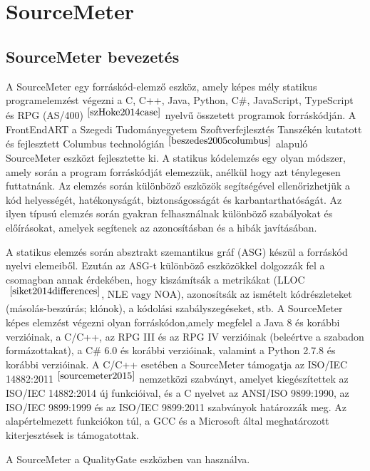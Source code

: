 \chapter{SourceMeter}\label{chap:SourceMeter}

\section{SourceMeter bevezetés}

\noindent

A SourceMeter egy forráskód-elemző eszköz, amely képes mély statikus programelemzést végezni a C, C++, Java, Python, C\#, JavaScript, TypeScript és RPG (AS/400)$^{~\cite{szHoke2014case}}$
nyelvű összetett programok forráskódján.
A FrontEndART a Szegedi Tudományegyetem Szoftverfejlesztés Tanszékén kutatott és fejlesztett Columbus technológián$^{~\cite{beszedes2005columbus}}$ alapuló SourceMeter eszközt fejlesztette ki.
A statikus kódelemzés egy olyan módszer, amely során a program forráskódját elemezzük, anélkül hogy azt ténylegesen futtatnánk.
Az elemzés során különböző eszközök segítségével ellenőrizhetjük a kód helyességét, hatékonyságát, biztonságosságát és karbantarthatóságát.
Az ilyen típusú elemzés során gyakran felhasználnak különböző szabályokat és előírásokat, amelyek segítenek az azonosításban és a hibák javításában.

\noindent

A statikus elemzés során absztrakt szemantikus gráf (ASG) készül a forráskód nyelvi elemeiből.
Ezután az ASG-t különböző eszközökkel dolgozzák fel a csomagban annak érdekében, hogy kiszámítsák a metrikákat (LLOC$^{~\cite{siket2014differences}}$, NLE vagy NOA),
azonosítsák az ismételt kódrészleteket (másolás-beszúrás; klónok), a kódolási szabályszegéseket, stb.
A SourceMeter képes elemzést végezni olyan forráskódon,amely megfelel a Java 8 és korábbi verzióinak, a C/C++,
az RPG III és az RPG IV verzióinak (beleértve a szabadon formázottakat), a C\# 6.0 és korábbi verzióinak, valamint a Python 2.7.8 és korábbi verzióinak.
A C/C++ esetében a SourceMeter támogatja az ISO/IEC 14882:2011$^{~\cite{sourcemeter2015}}$ nemzetközi szabványt, amelyet kiegészítettek az ISO/IEC 14882:2014 új funkcióival, és a C nyelvet az ANSI/ISO 9899:1990, az ISO/IEC 9899:1999 és az ISO/IEC 9899:2011 szabványok határozzák meg.
Az alapértelmezett funkciókon túl, a GCC és a Microsoft által meghatározott kiterjesztések is támogatottak.

\noindent

A SourceMeter a QualityGate eszközben van használva. 

